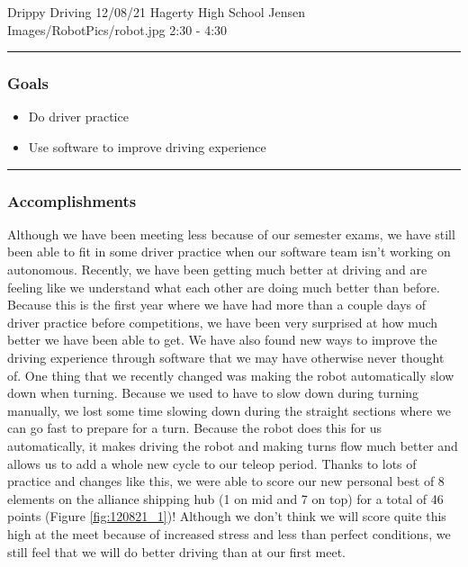 \insertmeeting 
	{Drippy Driving} 
	{12/08/21} 
	{Hagerty High School}
	{Jensen}
	{Images/RobotPics/robot.jpg}
	{2:30 - 4:30}
	
\noindent\hfil\rule{\textwidth}{.4pt}\hfil
\subsubsection*{Goals}
\begin{itemize}
    \item Do driver practice
    \item Use software to improve driving experience
 

\end{itemize} 

\noindent\hfil\rule{\textwidth}{.4pt}\hfil

\subsubsection*{Accomplishments}
Although we have been meeting less because of our semester exams, we have still been able to fit in some driver practice when our software team isn’t working on autonomous. Recently, we have been getting much better at driving and are feeling like we understand what each other are doing much better than before. Because this is the first year where we have had more than a couple days of driver practice before competitions, we have been very surprised at how much better we have been able to get. We have also found new ways to improve the driving experience through software that we may have otherwise never thought of. One thing that we recently changed was making the robot automatically slow down when turning. Because we used to have to slow down during turning manually, we lost some time slowing down during the straight sections where we can go fast to prepare for a turn. Because the robot does this for us automatically, it makes driving the robot and making turns flow much better and allows us to add a whole new cycle to our teleop period. Thanks to lots of practice and changes like this, we were able to score our new personal best of 8 elements on the alliance shipping hub (1 on mid and 7 on top) for a total of 46 points (Figure \ref{fig:120821_1})! Although we don't think we will score quite this high at the meet because of increased stress and less than perfect conditions, we still feel that we will do better driving than at our first meet.

